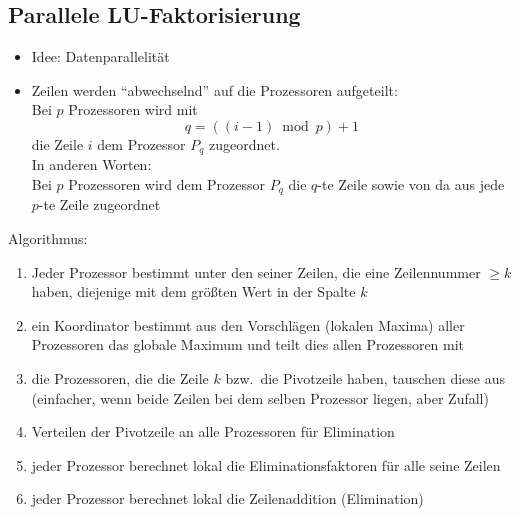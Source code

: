 \documentclass[a4paper, 12pt]{article}
\begin{document}
\subsection{Parallele LU-Faktorisierung}
\begin{itemize}
  \item Idee: Datenparallelität
  \item Zeilen werden ``abwechselnd'' auf die Prozessoren aufgeteilt:\\
    Bei \(p\) Prozessoren wird mit
    \[
    q=((i-1)\bmod p)+1
    \]
    die Zeile \(i\) dem Prozessor \(P_q\) zugeordnet.\\
    In anderen Worten:\\
    Bei \(p\) Prozessoren wird dem Prozessor \(P_q\) die \(q\)-te Zeile sowie von da aus jede \(p\)-te Zeile zugeordnet
\end{itemize}
Algorithmus:
\begin{enumerate}
  \item Jeder Prozessor bestimmt unter den seiner Zeilen, die eine Zeilennummer \(\ge k\) haben, diejenige mit dem größten Wert in der Spalte \(k\)
  \item ein Koordinator bestimmt aus den Vorschlägen (lokalen Maxima) aller Prozessoren das globale Maximum und teilt dies allen Prozessoren mit
  \item die Prozessoren, die die Zeile \(k\) bzw.\ die Pivotzeile haben, tauschen diese aus (einfacher, wenn beide Zeilen bei dem selben Prozessor liegen, aber Zufall)
  \item Verteilen der Pivotzeile an alle Prozessoren für Elimination
  \item jeder Prozessor berechnet lokal die Eliminationsfaktoren für alle seine Zeilen
  \item jeder Prozessor berechnet lokal die Zeilenaddition (Elimination)
\end{enumerate}
\end{document}
